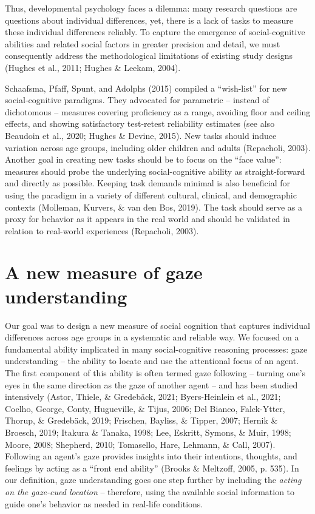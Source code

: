 \documentclass[
  man,floatsintext]{apa6}
\begin{document}
Thus, developmental psychology faces a dilemma: many research questions are questions about individual differences, yet, there is a lack of tasks to measure these individual differences reliably.
To capture the emergence of social-cognitive abilities and related social factors in greater precision and detail, we must consequently address the methodological limitations of existing study designs (Hughes et al., 2011; Hughes \& Leekam, 2004).

Schaafsma, Pfaff, Spunt, and Adolphs (2015) compiled a ``wish-list'' for new social-cognitive paradigms.
They advocated for parametric -- instead of dichotomous -- measures covering proficiency as a range, avoiding floor and ceiling effects, and showing satisfactory test-retest reliability estimates (see also Beaudoin et al., 2020; Hughes \& Devine, 2015).
New tasks should induce variation across age groups, including older children and adults (Repacholi, 2003).
Another goal in creating new tasks should be to focus on the ``face value'': measures should probe the underlying social-cognitive ability as straight-forward and directly as possible.
Keeping task demands minimal is also beneficial for using the paradigm in a variety of different cultural, clinical, and demographic contexts (Molleman, Kurvers, \& van den Bos, 2019).
The task should serve as a proxy for behavior as it appears in the real world and should be validated in relation to real-world experiences (Repacholi, 2003).

\hypertarget{a-new-measure-of-gaze-understanding}{%
\section{A new measure of gaze understanding}\label{a-new-measure-of-gaze-understanding}}

Our goal was to design a new measure of social cognition that captures individual differences across age groups in a systematic and reliable way.
We focused on a fundamental ability implicated in many social-cognitive reasoning processes: gaze understanding -- the ability to locate and use the attentional focus of an agent.
The first component of this ability is often termed gaze following -- turning one's eyes in the same direction as the gaze of another agent -- and has been studied intensively (Astor, Thiele, \& Gredebäck, 2021; Byers-Heinlein et al., 2021; Coelho, George, Conty, Hugueville, \& Tijus, 2006; Del Bianco, Falck-Ytter, Thorup, \& Gredebäck, 2019; Frischen, Bayliss, \& Tipper, 2007; Hernik \& Broesch, 2019; Itakura \& Tanaka, 1998; Lee, Eskritt, Symons, \& Muir, 1998; Moore, 2008; Shepherd, 2010; Tomasello, Hare, Lehmann, \& Call, 2007).
Following an agent's gaze provides insights into their intentions, thoughts, and feelings by acting as a ``front end ability'' (Brooks \& Meltzoff, 2005, p. 535).
In our definition, gaze understanding goes one step further by including the \emph{acting on the gaze-cued location} -- therefore, using the available social information to guide one's behavior as needed in real-life conditions.
\end{document}
